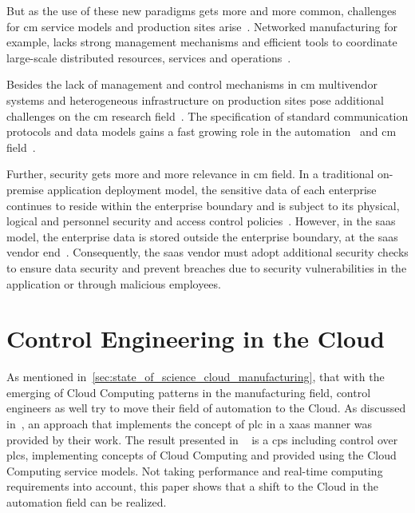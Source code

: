 \documentclass[
a4paper,
twoside,
headsepline,
cleardoublepage=empty,
parskip=half,
draft=false
]{scrbook}
\begin{document}
			But as the use of these new paradigms gets more and more common, challenges for \gls{cm} service models and production sites arise~\cite{brettel2014virtualization}.
			Networked manufacturing for example, lacks strong management mechanisms and efficient tools to coordinate large-scale distributed resources, services and operations~\cite{xu2012cloud}.
			
			Besides the lack of management and control mechanisms in \gls{cm} multivendor systems and heterogeneous infrastructure on production sites pose additional challenges on the \gls{cm} research field~\cite{weyer2015towards}.
			The specification of standard communication protocols and data models gains a fast growing role in the automation~\cite{jazdi2014cyber} and \gls{cm} field~\cite{wollschlaeger2017future}.
			
			Further, security gets more and more relevance in \gls{cm} field.
			In a traditional on-premise application deployment model, the sensitive data of each enterprise continues to reside within the enterprise boundary and is subject to its physical, logical and personnel security and access control policies~\cite{jeschke2017industrial}. 
			However, in the \gls{saas} model, the enterprise data is stored outside the enterprise boundary, at the \gls{saas} vendor end~\cite{subashini2011survey}.
			Consequently, the \gls{saas} vendor must adopt additional security checks to ensure data security and prevent breaches due to security vulnerabilities in the application or through malicious employees.

		\section{Control Engineering in the Cloud}\label{sec:control_engineering_in_the_cloud}

			As mentioned in~\cref{sec:state_of_science_cloud_manufacturing}, that with the emerging of Cloud Computing patterns in the manufacturing field, control engineers as well try to move their field of automation to the Cloud.
			As discussed in~\cite{jazdi2014cyber}, an approach that implements the concept of \gls{plc} in a \gls{xaas} manner was provided by their work. 
			The result presented in ~\cite{jazdi2014cyber} is a \gls{cps} including control over \gls{plc}s, implementing concepts of Cloud Computing and provided using the Cloud Computing service models. 
			Not taking performance and real-time computing requirements into account, this paper shows that a shift to the Cloud in the automation field can be realized.
			
\end{document}
